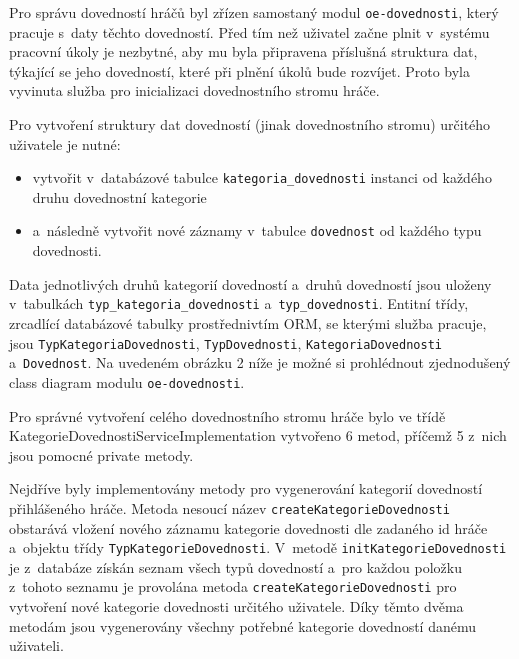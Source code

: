 \documentclass[twoside, 12pt]{article}
\begin{document}
{Pro správu dovedností hráčů byl zřízen samostaný modul \texttt{oe-dovednosti},
který pracuje s~daty těchto dovedností.
Před tím než uživatel začne plnit v~systému pracovní úkoly je nezbytné,
aby mu byla připravena příslušná struktura dat, týkající se jeho dovedností,
které při plnění úkolů bude rozvíjet.
Proto byla vyvinuta služba pro inicializaci dovednostního stromu hráče.

Pro vytvoření struktury dat dovedností (jinak dovednostního stromu) určitého uživatele je nutné:

\begin{itemize}

\item vytvořit v~databázové tabulce \texttt{kategoria\_dovednosti} instanci od každého druhu dovednostní kategorie
\item  a~následně vytvořit nové záznamy v~tabulce \texttt{dovednost} od každého typu dovednosti.
\end{itemize}

Data jednotlivých druhů kategorií dovedností a~druhů dovedností jsou
uloženy v~tabulkách \texttt{typ\_kategoria\_dovednosti} a~\texttt{typ\_dovednosti}.
Entitní třídy, zrcadlící databázové tabulky prostřednivtím ORM, se kterými služba pracuje,
jsou \texttt{TypKategoriaDovednosti}, \texttt{TypDovednosti}, \texttt{KategoriaDovednosti} a~\texttt{Dovednost}.
Na uvedeném obrázku 2 níže je možné si prohlédnout zjednodušený class diagram modulu \texttt{oe-dovednosti}.

\clearpage

\obrazek
{}

Pro správné vytvoření celého dovednostního stromu hráče bylo ve třídě KategorieDovednostiServiceImplementation vytvořeno 6 metod,
příčemž 5 z~nich jsou pomocné private metody.

Nejdříve byly implementovány metody pro vygenerování kategorií dovedností přihlášeného hráče.
Metoda nesoucí název \texttt{createKategorieDovednosti} obstarává vložení nového záznamu kategorie dovednosti dle zadaného id hráče a~objektu třídy
\texttt{TypKategorieDovednosti}.
V~metodě \texttt{initKategorieDovednosti} je z~databáze získán seznam všech typů dovedností
a~pro každou položku z~tohoto seznamu je provolána metoda \texttt{createKategorieDovednosti} pro vytvoření nové kategorie dovednosti určitého uživatele.
Díky těmto dvěma metodám jsou vygenerovány všechny potřebné kategorie dovedností danému uživateli.

}
\end{document}
